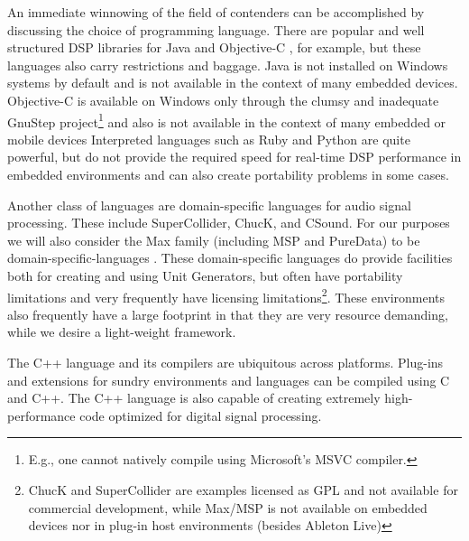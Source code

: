 \documentclass[twoside,10pt]{article}
\begin{document}
An immediate winnowing of the field of contenders can be accomplished by discussing the choice of programming language.  There are popular and well structured DSP libraries for Java \cite{Guillemard:2005, Burk:1998} and Objective-C \cite{Jaffe:1989,Jaffe:1991}, for example, but these languages also carry restrictions and baggage.  Java is not installed on Windows systems by default and is not available in the context of many embedded devices.  Objective-C is available on Windows only through the clumsy and inadequate GnuStep project\footnote{E.g., one cannot natively compile using Microsoft's MSVC compiler.} \cite{web3} and also is not available in the context of many embedded or mobile devices
Interpreted languages such as Ruby and Python are quite powerful, but do not provide the required speed for real-time DSP performance in embedded environments and can also create portability problems in some cases. 

Another class of languages are domain-specific languages for audio signal processing.  These include SuperCollider\cite{McCartney:1996}, ChucK\cite{wang:2008}, and CSound.  For our purposes we will also consider the Max family (including MSP\cite{Zicarelli:1998} and PureData\cite{Puckette:1996}) to be domain-specific-languages
.  
These domain-specific languages do provide facilities both for creating and using Unit Generators, but often have portability limitations and very frequently have licensing limitations\footnote{ChucK and SuperCollider are examples licensed as GPL and not available for commercial development, while Max/MSP is not available on embedded devices nor in plug-in host environments (besides Ableton Live)}.  These environments also frequently have a large footprint in that they are very resource demanding, while we desire a light-weight framework.

The C++ language and its compilers are ubiquitous across platforms.  Plug-ins and extensions for sundry environments and languages can be compiled using C and C++.  The C++ language is also capable of creating extremely high-performance code optimized for digital signal processing.
\end{document}
